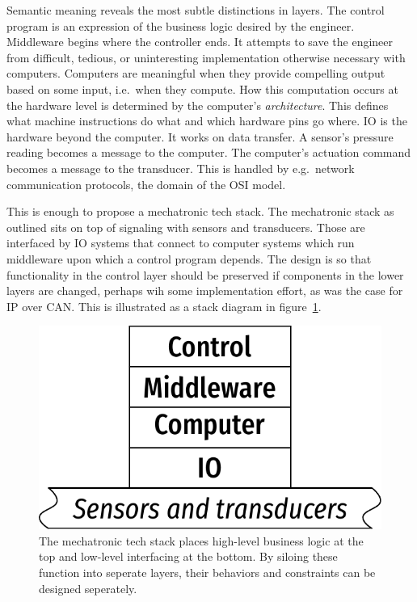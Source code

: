 \documentclass[english,12pt,a4paper,pdftex,eng,utf8]{aaltothesis}
\begin{document}
Semantic meaning reveals the most subtle distinctions in layers. The control program is an expression of the business logic desired by the engineer. Middleware begins where the controller ends. It attempts to save the engineer from difficult, tedious, or uninteresting implementation otherwise necessary with computers. Computers are meaningful when they provide compelling output based on some input, i.e.\ when they compute. How this computation occurs at the hardware level is determined by the computer's \textit{architecture}. This defines what machine instructions do what and which hardware pins go where. IO is the hardware beyond the computer. It works on data transfer. A sensor's pressure reading becomes a message to the computer. The computer's actuation command becomes a message to the transducer. This is handled by e.g.\ network communication protocols, the domain of the OSI model.

This is enough to propose a mechatronic tech stack. The mechatronic stack as outlined sits on top of signaling with sensors and transducers. Those are interfaced by IO systems that connect to computer systems which run middleware upon which a control program depends. The design is so that functionality in the control layer should be preserved if components in the lower layers are changed, perhaps wih some implementation effort, as was the case for IP over CAN.  This is illustrated as a stack diagram in figure~\ref{fig:mechatronic_tech_stack}.

\begin{figure}[h]
  \centering
  \includegraphics[width=\textwidth]{assets/mechatronic_tech_stack}
  \caption{The mechatronic tech stack places high-level business logic at the top and low-level interfacing at the bottom.  By siloing these function into seperate layers, their behaviors and constraints can be designed seperately.}\label{fig:mechatronic_tech_stack}
\end{figure}
\end{document}
